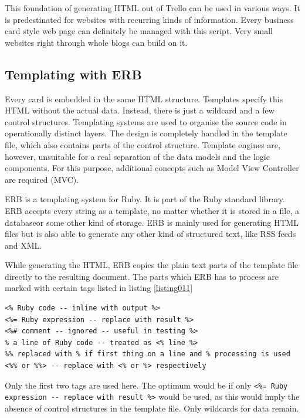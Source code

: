 This foundation of generating HTML out of Trello can be used in various ways. It is predestinated for websites with recurring kinds of information. Every business card style web page can definitely be managed with this script. Very small websites right through whole blogs can build on it.

\subsection{Templating with ERB}
Every card is embedded in the same HTML structure. Templates specify this HTML without the actual data. Instead, there is just a wildcard and a few control structures. Templating systems are used to organise the source code in operationally distinct layers. The design is completely handled in the template file, which also contains parts of the control structure. Template engines are, however, unsuitable for a real separation of the data models and the logic components. For this purpose, additional concepts such as Model View Controller are required (MVC).

ERB is a templating system for Ruby. It is part of the Ruby standard library. ERB accepts every string as a template, no matter whether it is stored in a file, a database\komma or some other kind of storage. ERB is mainly used for generating HTML files but is also able to generate any other kind of structured text, like RSS feeds and XML. \cite{erb:introduction} \cite{erb:docu}

While generating the HTML, ERB copies the plain text parts of the template file directly to the resulting document.  The parts which ERB has to process are marked with certain tags listed in listing \ref{listing011}
\begin{lstlisting}[aboveskip=1\baselineskip, style=bash, caption=Recognised tags in ERB., label=listing011]
<% Ruby code -- inline with output %>
<%= Ruby expression -- replace with result %>
<%# comment -- ignored -- useful in testing %>
% a line of Ruby code -- treated as <% line %> 
%% replaced with % if first thing on a line and % processing is used
<%% or %%> -- replace with <% or %> respectively
\end{lstlisting}
Only the first two tags are used here. The optimum would be if only \lstinline{<%= Ruby expression -- replace with result %>} would be used, as this would imply the absence of control structures in the template file. Only wildcards for data remain.

